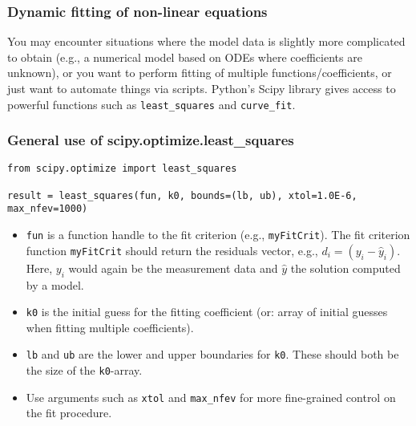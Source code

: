 \begin{frame}[fragile] 
  \frametitle{Dynamic fitting of non-linear equations}
  You may encounter situations where the model data is slightly more complicated to obtain (e.g., a numerical model based on ODEs where coefficients are unknown), or you want to perform fitting of multiple functions/coefficients, or just want to automate things via scripts. Python's Scipy library gives access to powerful functions such as \lstinline$least_squares$ and \lstinline$curve_fit$.
\end{frame}
  
\begin{frame}[fragile] 
  \frametitle{General use of scipy.optimize.least\_squares}
  \begin{lstlisting}
from scipy.optimize import least_squares

result = least_squares(fun, k0, bounds=(lb, ub), xtol=1.0E-6, max_nfev=1000)
  \end{lstlisting}
  \begin{itemize}
    \item \lstinline$fun$ is a function handle to the fit criterion (e.g., \lstinline$myFitCrit$). The fit criterion function \lstinline$myFitCrit$ should return the residuals vector, e.g., $d_i = \left(y_i - \hat{y}_i\right)$. Here, $y_i$ would again be the measurement data and $\hat{y}$ the solution computed by a model.
    \item \lstinline$k0$ is the initial guess for the fitting coefficient (or: array of initial guesses when fitting multiple coefficients).
    \item \lstinline$lb$ and \lstinline$ub$ are the lower and upper boundaries for \lstinline$k0$. These should both be the size of the \lstinline$k0$-array.
    \item Use arguments such as \lstinline$xtol$ and \lstinline$max_nfev$ for more fine-grained control on the fit procedure. 
  \end{itemize}  
\end{frame}
  
